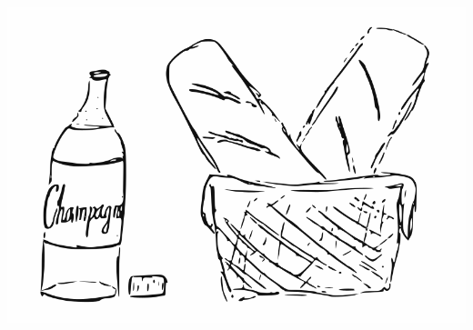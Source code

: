 
\clearpage
\begin{intersong}
\begin{center}
\includegraphics[scale=0.5]{../bilder/batongochvin.png} 
\end{center}
\end{intersong}

